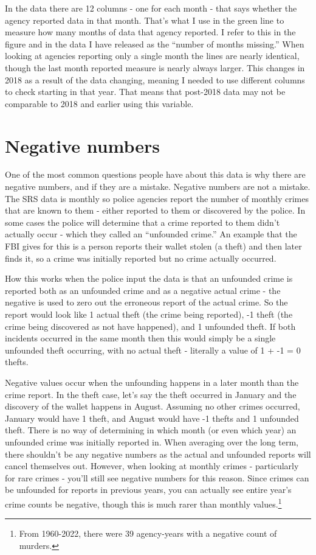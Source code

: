 \documentclass[
  12pt,
  openany]{book}
\begin{document}
In the data there are 12 columns - one for each month - that says whether the agency reported data in that month. That's what I use in the green line to measure how many months of data that agency reported. I refer to this in the figure and in the data I have released as the ``number of months missing.'' When looking at agencies reporting only a single month the lines are nearly identical, though the last month reported measure is nearly always larger. This changes in 2018 as a result of the data changing, meaning I needed to use different columns to check starting in that year. That means that post-2018 data may not be comparable to 2018 and earlier using this variable.

\section{Negative numbers}\label{negative-numbers}

One of the most common questions people have about this data is why there are negative numbers, and if they are a mistake. Negative numbers are not a mistake. The SRS data is monthly so police agencies report the number of monthly crimes that are known to them - either reported to them or discovered by the police. In some cases the police will determine that a crime reported to them didn't actually occur - which they called an ``unfounded crime.'' An example that the FBI gives for this is a person reports their wallet stolen (a theft) and then later finds it, so a crime was initially reported but no crime actually occurred.

How this works when the police input the data is that an unfounded crime is reported both as an unfounded crime and as a negative actual crime - the negative is used to zero out the erroneous report of the actual crime. So the report would look like 1 actual theft (the crime being reported), -1 theft (the crime being discovered as not have happened), and 1 unfounded theft. If both incidents occurred in the same month then this would simply be a single unfounded theft occurring, with no actual theft - literally a value of 1 + -1 = 0 thefts.

Negative values occur when the unfounding happens in a later month than the crime report. In the theft case, let's say the theft occurred in January and the discovery of the wallet happens in August. Assuming no other crimes occurred, January would have 1 theft, and August would have -1 thefts and 1 unfounded theft. There is no way of determining in which month (or even which year) an unfounded crime was initially reported in. When averaging over the long term, there shouldn't be any negative numbers as the actual and unfounded reports will cancel themselves out. However, when looking at monthly crimes - particularly for rare crimes - you'll still see negative numbers for this reason. Since crimes can be unfounded for reports in previous years, you can actually see entire year's crime counts be negative, though this is much rarer than monthly values.\footnote{From 1960-2022, there were 39 agency-years with a negative count of murders.}
\end{document}
